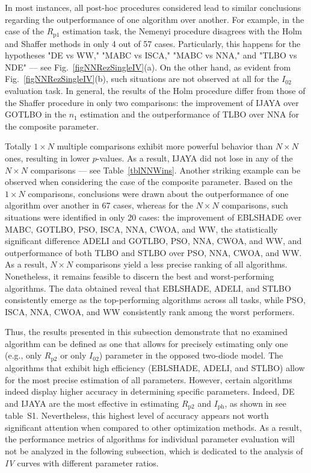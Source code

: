 \documentclass[a4paper,fleqn]{cas-sc}
\begin{document}
In most instances, all post-hoc procedures considered lead to similar conclusions
regarding the outperformance of one algorithm over another.
For example, in the case of the $R_\mathrm{p1}$ estimation task,
the Nemenyi procedure disagrees with the Holm and Shaffer methods in only 4 out of 57 cases.
Particularly, this happens for the hypotheses "DE vs WW," "MABC vs ISCA," "MABC vs NNA," and "TLBO vs NDE" --- see Fig.~\ref{figNNRezSingleIV}(a).
On the other hand, as evident from Fig.~\ref{figNNRezSingleIV}(b),
such situations are not observed at all for the $I_{02}$ evaluation task.
In general, the results of the Holm procedure differ from those of the Shaffer procedure in only two comparisons:
the improvement of IJAYA over GOTLBO in the $n_1$  estimation and the outperformance of TLBO over NNA for the composite parameter.


Totally $1\times N$ multiple comparisons exhibit more powerful behavior than $N\times N$ ones, resulting in lower $p$-values.
As a result, IJAYA did not lose in any of the $N\times N$ comparisons --- see Table~\ref{tblNNWins}.
Another striking  example can be observed when considering the case of the composite parameter.
Based on the $1\times N$ comparisons, conclusions were drawn about the outperformance of one algorithm over another in 67 cases,
whereas for the $N\times N$ comparisons, such situations were identified in only 20 cases:
the improvement of EBLSHADE over MABC, GOTLBO, PSO, ISCA, NNA, CWOA, and WW,
the statistically significant difference ADELI and GOTLBO, PSO, NNA, CWOA, and WW,
and outperformance of both TLBO and STLBO over PSO, NNA, CWOA, and WW.
As a result, $N\times N$ comparisons yield a less precise ranking of all algorithms.
Nonetheless, it remains feasible to discern the best and worst-performing algorithms.
The data obtained reveal that EBLSHADE, ADELI, and STLBO consistently emerge as the top-performing algorithms across all tasks,
while PSO, ISCA, NNA, CWOA, and WW consistently rank among the worst performers.

Thus, the results presented in this subsection demonstrate that
no examined algorithm can be defined as one that allows for precisely estimating only one
(e.g., only $R_\mathrm{p2}$ or only $I_{02}$) parameter in the opposed two-diode model.
The algorithms that exhibit high efficiency (EBLSHADE, ADELI, and STLBO)
allow for the most precise estimation of all parameters.
However, certain algorithms indeed display higher accuracy in determining specific parameters.
Indeed, DE and IJAYA are the most effective in estimating $R_\mathrm{p2}$ and $I_\mathrm{ph}$, as shown in see table~S1.
Nevertheless, this highest level of accuracy appears not worth significant attention when compared to other optimization methods.
As a result, the performance metrics of algorithms for individual parameter evaluation will not be analyzed in the following subsection,
which is dedicated to the analysis of \emph{IV} curves with different parameter ratios.
\end{document}
